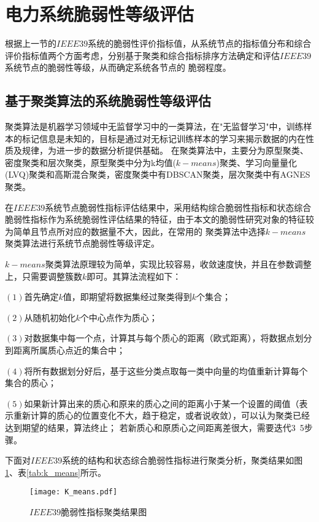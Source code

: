 \section{电力系统脆弱性等级评估}
\label{sec:multiAssessment}
根据上一节的$IEEE39$系统的脆弱性评价指标值，从系统节点的指标值分布和综合评价指标值两个方面考虑，分别基于聚类和综合指标排序方法确定和评估$IEEE39$系统节点的脆弱性等级，从而确定系统各节点的
脆弱程度。

\subsection{基于聚类算法的系统脆弱性等级评估}
\label{sec:K_means1}

聚类算法是机器学习领域中无监督学习中的一类算法，在"无监督学习"中，训练样本的标记信息是未知的，目标是通过对无标记训练样本的学习来揭示数据的内在性质及规律，为进一步的数据分析提供基础\cite{refs82}。
在聚类算法中，主要分为原型聚类、密度聚类和层次聚类，原型聚类中分为k均值($k-means$)聚类、学习向量量化(LVQ)聚类和高斯混合聚类，密度聚类中有DBSCAN聚类，层次聚类中有AGNES聚类。

在$IEEE39$系统节点脆弱性指标评估结果中，采用结构综合脆弱性指标和状态综合脆弱性指标作为系统脆弱性评估结果的特征，由于本文的脆弱性研究对象的特征较为简单且节点所对应的数据量不大，因此，在常用的
聚类算法中选择$k-means$聚类算法进行系统节点脆弱性等级评定。

$k-means$聚类算法原理较为简单，实现比较容易，收敛速度快，并且在参数调整上，只需要调整簇数$k$即可。其算法流程如下：

$(1)$首先确定$k$值，即期望将数据集经过聚类得到$k$个集合；

$(2)$从随机初始化$k$个中心点作为质心；

$(3)$对数据集中每一个点，计算其与每个质心的距离（欧式距离），将数据点划分到距离所属质心点近的集合中；

$(4)$将所有数据划分好后，基于这些分类点取每一类中向量的均值重新计算每个集合的质心；

$(5)$如果新计算出来的质心和原来的质心之间的距离小于某一个设置的阈值（表示重新计算的质心的位置变化不大，趋于稳定，或者说收敛），可以认为聚类已经达到期望的结果，算法终止；
若新质心和原质心之间距离差很大，需要迭代3~5步骤。

下面对$IEEE39$系统的结构和状态综合脆弱性指标进行聚类分析，聚类结果如图\ref{fig:K_means}、表\ref{tab:k_means}所示。
\begin{figure}[H] %
  \centering
  \texttt{[image: K\_means.pdf]}
  \caption{$IEEE39$脆弱性指标聚类结果图}
  \label{fig:K_means}
\end{figure}

